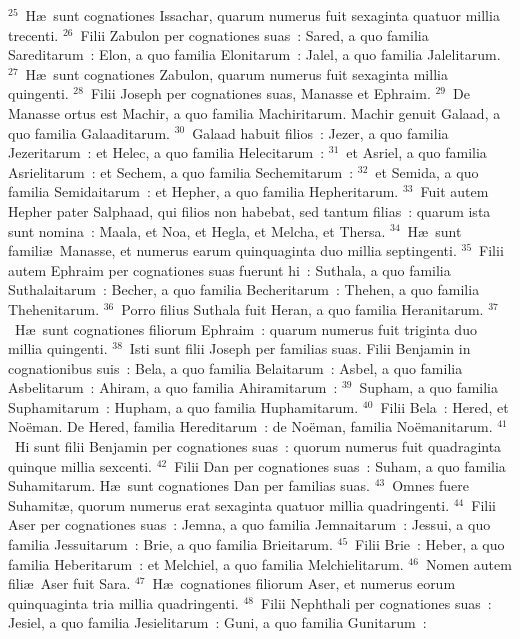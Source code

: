 ${}^{25}$~H\ae\ sunt cognationes Issachar, quarum numerus fuit sexaginta quatuor millia trecenti.
${}^{26}$~Filii Zabulon per cognationes suas~: Sared, a quo familia Sareditarum~: Elon, a quo familia Elonitarum~: Jalel, a quo familia Jalelitarum.
${}^{27}$~H\ae\ sunt cognationes Zabulon, quarum numerus fuit sexaginta millia quingenti.
${}^{28}$~Filii Joseph per cognationes suas, Manasse et Ephraim.
${}^{29}$~De Manasse ortus est Machir, a quo familia Machiritarum. Machir genuit Galaad, a quo familia Galaaditarum.
${}^{30}$~Galaad habuit filios~: Jezer, a quo familia Jezeritarum~: et Helec, a quo familia Helecitarum~:
${}^{31}$~et Asriel, a quo familia Asrielitarum~: et Sechem, a quo familia Sechemitarum~:
${}^{32}$~et Semida, a quo familia Semidaitarum~: et Hepher, a quo familia Hepheritarum.
${}^{33}$~Fuit autem Hepher pater Salphaad, qui filios non habebat, sed tantum filias~: quarum ista sunt nomina~: Maala, et Noa, et Hegla, et Melcha, et Thersa.
${}^{34}$~H\ae\ sunt famili\ae\ Manasse, et numerus earum quinquaginta duo millia septingenti.
${}^{35}$~Filii autem Ephraim per cognationes suas fuerunt hi~: Suthala, a quo familia Suthalaitarum~: Becher, a quo familia Becheritarum~: Thehen, a quo familia Thehenitarum.
${}^{36}$~Porro filius Suthala fuit Heran, a quo familia Heranitarum.
${}^{37}$~H\ae\ sunt cognationes filiorum Ephraim~: quarum numerus fuit triginta duo millia quingenti.
${}^{38}$~Isti sunt filii Joseph per familias suas. Filii Benjamin in cognationibus suis~: Bela, a quo familia Belaitarum~: Asbel, a quo familia Asbelitarum~: Ahiram, a quo familia Ahiramitarum~:
${}^{39}$~Supham, a quo familia Suphamitarum~: Hupham, a quo familia Huphamitarum.
${}^{40}$~Filii Bela~: Hered, et No\"eman. De Hered, familia Hereditarum~: de No\"eman, familia No\"emanitarum.
${}^{41}$~Hi sunt filii Benjamin per cognationes suas~: quorum numerus fuit quadraginta quinque millia sexcenti.
${}^{42}$~Filii Dan per cognationes suas~: Suham, a quo familia Suhamitarum. H\ae\ sunt cognationes Dan per familias suas.
${}^{43}$~Omnes fuere Suhamit\ae , quorum numerus erat sexaginta quatuor millia quadringenti.
${}^{44}$~Filii Aser per cognationes suas~: Jemna, a quo familia Jemnaitarum~: Jessui, a quo familia Jessuitarum~: Brie, a quo familia Brieitarum.
${}^{45}$~Filii Brie~: Heber, a quo familia Heberitarum~: et Melchiel, a quo familia Melchielitarum.
${}^{46}$~Nomen autem fili\ae\ Aser fuit Sara.
${}^{47}$~H\ae\ cognationes filiorum Aser, et numerus eorum quinquaginta tria millia quadringenti.
${}^{48}$~Filii Nephthali per cognationes suas~: Jesiel, a quo familia Jesielitarum~: Guni, a quo familia Gunitarum~:
